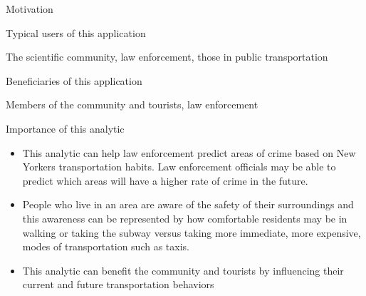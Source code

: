 \documentclass[10pt,ignorenonframetext,]{beamer}
\providecommand{\tightlist}{%
  \setlength{\itemsep}{0pt}\setlength{\parskip}{0pt}}
\begin{document}
\begin{frame}{Motivation}

\begin{block}{Typical users of this application}

The scientific community, law enforcement, those in public
transportation

\end{block}

\begin{block}{Beneficiaries of this application}

Members of the community and tourists, law enforcement

\end{block}

\begin{block}{Importance of this analytic}

\begin{itemize}
\tightlist
\item
  This analytic can help law enforcement predict areas of crime based on
  New Yorkers transportation habits. Law enforcement officials may be
  able to predict which areas will have a higher rate of crime in the
  future.
\item
  People who live in an area are aware of the safety of their
  surroundings and this awareness can be represented by how comfortable
  residents may be in walking or taking the subway versus taking more
  immediate, more expensive, modes of transportation such as taxis.
\item
  This analytic can benefit the community and tourists by influencing
  their current and future transportation behaviors
\end{itemize}

\end{block}

\end{frame}
\end{document}
